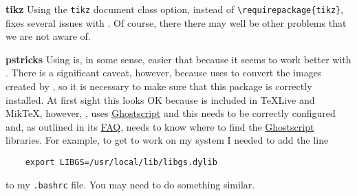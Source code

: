 \documentclass[svgnames]{article}
\begin{document}
\noindent\textbf{tikz}
Using the \Verb|tikz| document class option, instead of
\Verb|\requirepackage{tikz}|, fixes several issues with
. Of course, there  there may well be other problems
that we are not aware of.

\noindent\textbf{pstricks}
Using  is, in some sense, easier that 
because it seems to work better with . There is a
significant caveat, however, because  uses   to
convert the images created by , so it is necessary to
make sure that this package is correctly installed. At first sight this
looks OK because  is included in \TeX Live and Mik\TeX,
however, ,  uses
\href{https://www.ghostscript.com/}{Ghostscript} and this needs to be
correctly configured and, as outlined in its
\href{http://dvisvgm.bplaced.net/FAQ}{FAQ},  needs to know
where to find the \href{https://www.ghostscript.com/}{Ghostscript}
libraries. For example, to get  to work on my system I
needed to add the line
\begin{verbatim}
    export LIBGS=/usr/local/lib/libgs.dylib
\end{verbatim}
to my \Verb|.bashrc| file. You may need to do something similar.
\end{document}
